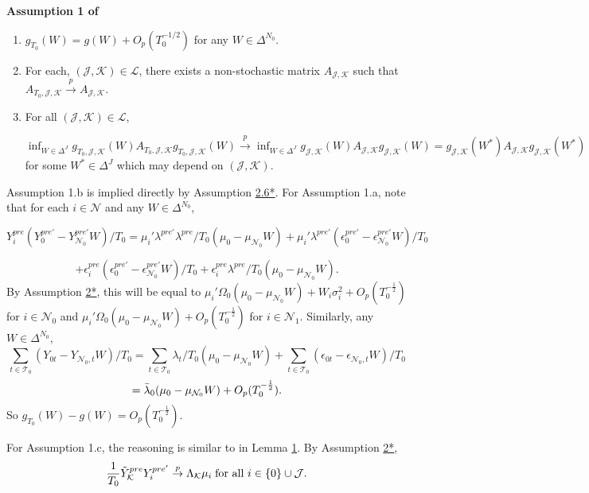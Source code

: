 \documentclass{article}
\begin{document}
\textbf{Assumption 1 of \cite{MomentSelection}}
\begin{enumerate}[label=\alph*]
    \item $g_{T_0}(W) = g(W) +O_p(T_0^{-1/2})$ for any $W \in \Delta^{N_0}$.
    \item For each, $(\mathcal{\mathcal{J}},\mathcal{K}) \in \mathcal{L}$, there exists a non-stochastic matrix $A_{\mathcal{J},\mathcal{K}}$ such that $A_{T_0,\mathcal{J},\mathcal{K}} \overset{p}{\rightarrow} A_{\mathcal{J},\mathcal{K}}$.
    \item For all $(\mathcal{J},\mathcal{K}) \in \mathcal{L}$, 
    
    $\inf_{W \in \Delta^J} g_{T_0,\mathcal{J},\mathcal{K}}(W)A_{T_0,\mathcal{J},\mathcal{K}}g_{T_0,\mathcal{J},\mathcal{K}}(W) \overset{p}{\rightarrow} \inf_{W \in \Delta^J} g_{\mathcal{J},\mathcal{K}}(W)A_{\mathcal{J},\mathcal{K}} g_{\mathcal{J},\mathcal{K}} (W) = g_{\mathcal{J},\mathcal{K}}(W^*)A_{\mathcal{J},\mathcal{K}} g_{\mathcal{J},\mathcal{K}}(W^*)$ for some $W^* \in \Delta^J$ which may depend on $(\mathcal{J},\mathcal{K})$.
\end{enumerate}

Assumption 1.b is implied directly by Assumption \hyperref[A2*]{2.6*}. For Assumption 1.a, note that for each $i \in \mathcal{N}$ and any $W \in \Delta^{N_0}$,

$$Y_{i}^{pre}(Y_0^{pre'} - Y_{\mathcal{N}_0}^{pre'}W)/T_0 =
\mu_{i}'\lambda^{pre'}\lambda^{pre}/T_0(\mu_0 - \mu_{\mathcal{N}_0}W) + \mu_{i}'\lambda^{pre'}(\epsilon_0^{pre'} - \epsilon_{\mathcal{N}_0}^{pre'}W)/T_0
$$

$$ + \epsilon_{i}^{pre}(\epsilon_0^{pre'} - \epsilon_{\mathcal{N}_0}^{pre'}W)/T_0  + \epsilon_i^{pre}\lambda^{pre}/T_0(\mu_0 - \mu_{\mathcal{N}_0}W) .$$
By Assumption \hyperref[A2*]{2*}, this will be equal to $ \mu_i' \Omega_0 (\mu_0 - \mu_{\mathcal{N}_0}W) + W_i \sigma_i^2 + O_p(T_0^{-\frac{1}{2}})$ for $i \in \mathcal{N}_0$ and $\mu_i' \Omega_0 (\mu_0 - \mu_{\mathcal{N}_0}W) + O_p(T_0^{-\frac{1}{2}})$ for $i \in \mathcal{N}_1$. Similarly, any $W \in \Delta^{N_0}$,
$$\sum_{t \in \mathcal{T}_0}(Y_{0t} - Y_{\mathcal{N}_0,t}W)/T_0 = \sum_{t \in \mathcal{T}_0} \lambda_t /T_0 (\mu_0 - \mu_{\mathcal{N}_0}W) + \sum_{t \in \mathcal{T}_0}(\epsilon_{0t} - \epsilon_{\mathcal{N}_0,t}W)/T_0$$
$$= \Bar{\lambda}_0 (\mu_0 - \mu_{\mathcal{N}_0}W) + O_p(T_0^{-\frac{1}{2}}).$$
So $g_{T_0}(W) - g(W) = O_p(T_0^{-\frac{1}{2}})$.

For Assumption 1.c, the reasoning is similar to in Lemma \hyperref[L1]{1}. By Assumption \hyperref[A2*]{2*}, 
\begin{equation*}
    \frac{1}{T_0} \Tilde{Y}_{\mathcal{K}}^{pre}Y_{i}^{pre'}  \overset{p}{\rightarrow} \Lambda_{\mathcal{K}} \mu_i \; \text{for all } i \in \{0\} \cup \mathcal{J}.
\end{equation*}
\end{document}
